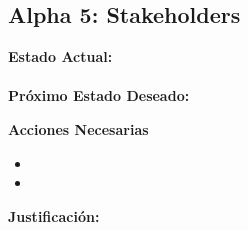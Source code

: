 \documentclass[12pt]{article}
\begin{document}
\vspace{0.3cm}

\subsection{Alpha 5: Stakeholders}

\textbf{Estado Actual:} \textit{} \\
\hspace*{1cm} \\
\textbf{Próximo Estado Deseado:} \textit{} \\
\hspace*{1cm}

\vspace{0.1cm}

\textbf{Acciones Necesarias}
\begin{itemize}
    \item 
    \item 
\end{itemize}

\vspace{0.1cm}

\textbf{Justificación:} 

\vspace{0.3cm}


%
%
%
%
%
%
\end{document}
